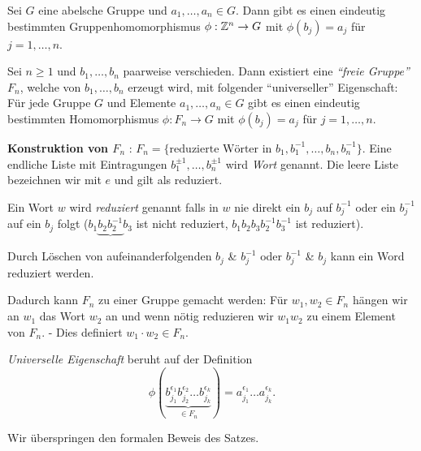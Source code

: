 \begin{lemma}
	Sei $G$ eine abelsche Gruppe und $a_1,\ldots,a_{n} \in G$. Dann gibt es einen eindeutig bestimmten 
	Gruppenhomomorphismus $\phi: \mathbb{Z}^{n} \to G$ mit $\phi(b_{j}) = a_{j}$ für $j = 1,\ldots,n$.
\end{lemma}


\begin{theorem}
	Sei $n \geq 1$ und $b_1,\ldots,b_{n}$ paarweise verschieden. Dann existiert eine \emph{\enquote{freie Gruppe} $F_{n}$},
	welche von $b_1,\ldots,b_{n}$ erzeugt wird, mit folgender \enquote{universeller} Eigenschaft:
	Für jede Gruppe $G$ und Elemente $a_1,\ldots,a_{n} \in G$ gibt es einen eindeutig bestimmten Homomorphismus 
	$\phi: F_{n} \to G$ mit $\phi(b_{j}) = a_{j}$ für $j=1,\ldots,n$.
\end{theorem}

\textbf{Konstruktion von $F_{n}$ }:
$F_{n} = \{\text{reduzierte Wörter in } b_1, b_1^{-1},\ldots,b_{n},b_{n}^{-1}\}$.
Eine endliche Liste mit Eintragungen $b_1^{\pm 1},\ldots,b_{n}^{\pm 1}$ wird \emph{Wort} genannt.
Die leere Liste bezeichnen wir mit $e$ und gilt als reduziert.

Ein Wort $w$ wird \emph{reduziert} genannt falls in $w$ nie direkt ein $b_{j}$ auf $b_{j}^{-1}$ oder ein $b_{j}^{-1}$ auf ein $b_{j}$ folgt 
($b_1 \underbrace{b_2 b_2^{-1}} b_3$ ist nicht reduziert, $b_1 b_2 b_3 b_2^{-1} b_3^{-1}$ ist reduziert).

Durch Löschen von aufeinanderfolgenden $b_{j}$ \& $b_{j}^{-1}$ oder $b_{j}^{-1}$ \& $b_{j}$ kann ein Word reduziert werden.

Dadurch kann $F_{n}$ zu einer Gruppe gemacht werden:
Für $w_1, w_2 \in F_{n}$ hängen wir an $w_1$ das Wort $w_2$ an und wenn nötig reduzieren wir $w_1 w_2$ zu einem Element von $F_{n}$.
- Dies definiert $w_1 \cdot w_2 \in F_{n}$.

\emph{Universelle Eigenschaft} beruht auf der Definition
\[
	\phi(\underbrace{b_{j_1}^{\epsilon_1} b_{j_2}^{\epsilon_2} \ldots b_{j_{k}}^{\epsilon_{k}}}_{\in F_{n}}) = a_{j_1}^{\epsilon_1} \ldots a_{j_{k}}^{\epsilon_{k}}
.\]

Wir überspringen den formalen Beweis des Satzes.

